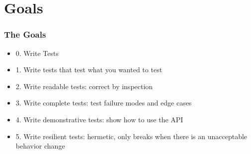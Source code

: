 \section{Goals}

\begin{frame}[fragile,t]
\frametitle{The Goals}
\begin{itemize}
\item 0. Write Tests
\item 1. Write tests that test what you wanted to test
\item 2. Write readable tests: correct by inspection
\item 3. Write complete tests: test failure modes and edge cases
\item 4. Write demonstrative tests: show how to use the API
\item 5. Write resilient tests: hermetic, only breaks when there is an
  unacceptable behavior change
\end{itemize}
\end{frame}



